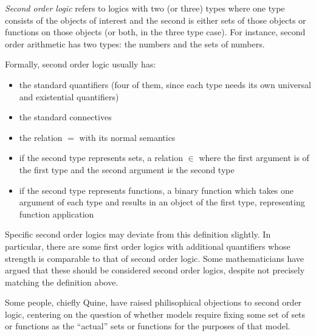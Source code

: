 \documentclass[12pt]{article}
\begin{document}
\emph{Second order logic} refers to logics with two (or three) types where one type consists of the objects of interest and the second is either sets of those objects or functions on those objects (or both, in the three type case).  For instance, second order arithmetic has two types: the numbers and the sets of numbers.

Formally, second order logic usually has:

\begin{itemize}
\item the standard quantifiers (four of them, since each type needs its own universal and existential quantifiers)

\item the standard connectives

\item the relation $=$ with its normal semantics

\item if the second type represents sets, a relation $\in$ where the first argument is of the first type and the second argument is the second type

\item if the second type represents functions, a binary function which takes one argument of each type and results in an object of the first type, representing function application
\end{itemize}

Specific second order logics may deviate from this definition slightly.  In particular, there are some first order logics with additional quantifiers whose strength is comparable to that of second order logic.  Some mathematicians have argued that these should be considered second order logics, despite not precisely matching the definition above.

Some people, chiefly Quine, have raised philisophical objections to second order logic, centering on the question of whether models require fixing some set of sets or functions as the ``actual'' sets or functions for the purposes of that model.
\end{document}
